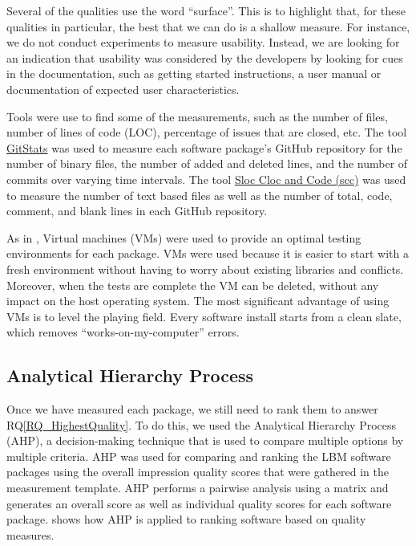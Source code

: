 \documentclass[final, 3p, times, authoryear]{elsarticle}
\newcommand{\rqref}[1]{RQ\ref{#1}}
\begin{document}
Several of the qualities use the word ``surface''.  This is to highlight that,
for these qualities in particular, the best that we can do is a shallow measure.
For instance, we do not conduct experiments to measure usability. Instead, we
are looking for an indication that usability was considered by the developers by
looking for cues in the documentation, such as getting started instructions, a
user manual or documentation of expected user characteristics.

Tools were use to find some of the measurements, such as the number of files,
number of lines of code (LOC), percentage of issues that are closed, etc. The
tool \href{https://github.com/tomgi/git_stats}{GitStats} was used to measure
each software package's GitHub repository for the number of binary files, the
number of added and deleted lines, and the number of commits over varying time
intervals. The tool \href{https://github.com/boyter/scc}{Sloc Cloc and Code
(scc)} was used to measure the number of text based files as well as the number
of total, code, comment, and blank lines in each GitHub repository.

As in \citet{SmithEtAl2016}, Virtual machines (VMs) were used to provide an
optimal testing environments for each package. VMs were used because it is
easier to start with a fresh environment without having to worry about existing
libraries and conflicts. Moreover, when the tests are complete the VM can be
deleted, without any impact on the host operating system. The most significant
advantage of using VMs is to level the playing field. Every software install
starts from a clean slate, which removes ``works-on-my-computer'' errors.

\subsection{Analytical Hierarchy Process} \label{AHP}

Once we have measured each package, we still need to rank them to answer
\rqref{RQ_HighestQuality}.  To do this, we used the Analytical Hierarchy Process
(AHP), a decision-making technique that is used to compare multiple options by
multiple criteria. AHP was used for comparing and ranking the LBM software
packages using the overall impression quality scores that were gathered in the
measurement template.  AHP performs a pairwise analysis using a matrix and
generates an overall score as well as individual quality scores for each
software package. \citep{SmithEtAl2016} shows how AHP is applied to ranking
software based on quality measures. 
\end{document}
